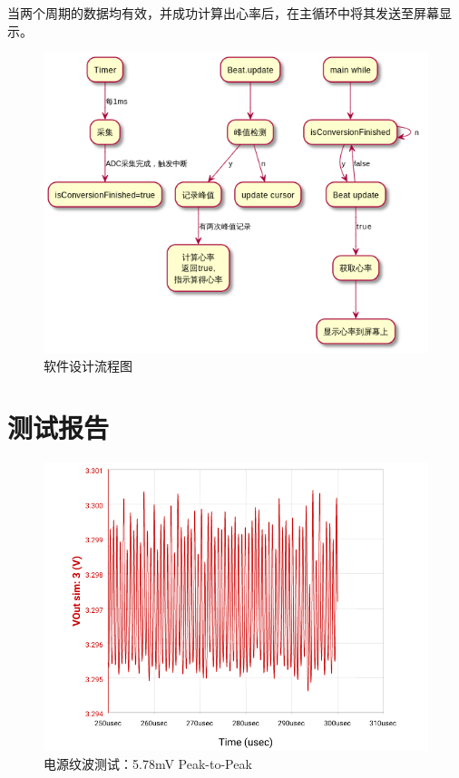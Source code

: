 \documentclass[a4paper]{ctexart}
\begin{document}
	当两个周期的数据均有效，并成功计算出心率后，在主循环中将其发送至屏幕显示。

\begin{figure}[H]
	\centering
	\includegraphics[width=1.0\textwidth]{software.png}
	\caption{软件设计流程图}
\end{figure}
	
\newpage
\section{测试报告}

\begin{figure}[H]
	\centering
	\includegraphics[width=1.0\textwidth]{amCharts.png}
	\caption{电源纹波测试：5.78mV Peak-to-Peak}
\end{figure}
\end{document}
